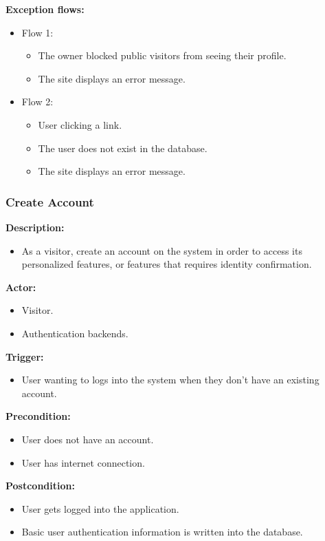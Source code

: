 \documentclass[a4paper]{article}
\begin{document}
\textbf{Exception flows:}
\begin{itemize}
    \item Flow 1:
          \begin{itemize}
              \item The owner blocked public visitors from seeing their profile.
              \item The site displays an error message.
          \end{itemize}
    \item Flow 2:
          \begin{itemize}
              \item User clicking a link.
              \item The user does not exist in the database.
              \item The site displays an error message.
          \end{itemize}
\end{itemize}

\subsubsection{Create Account}
\textbf{Description:}
\begin{itemize}
    \item As a visitor, create an account on the system in order to access its personalized features, or features that requires identity confirmation.
\end{itemize}

\textbf{Actor:}
\begin{itemize}
    \item Visitor.
    \item Authentication backends.
\end{itemize}

\textbf{Trigger:}
\begin{itemize}
    \item User wanting to logs into the system when they don't have an existing account.
\end{itemize}

\textbf{Precondition:}
\begin{itemize}
    \item User does not have an account.
    \item User has internet connection.
\end{itemize}

\textbf{Postcondition:}
\begin{itemize}
    \item User gets logged into the application.
    \item Basic user authentication information is written into the database.
\end{itemize}
\end{document}
